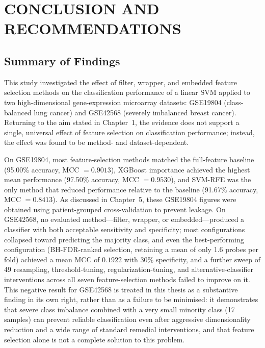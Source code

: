 \chapter{CONCLUSION AND RECOMMENDATIONS}

\section{Summary of Findings}

This study investigated the effect of filter, wrapper, and embedded feature selection methods on the classification performance of a linear SVM applied to two high-dimensional gene-expression microarray datasets: GSE19804 (class-balanced lung cancer) and GSE42568 (severely imbalanced breast cancer). Returning to the aim stated in Chapter~1, the evidence does not support a single, universal effect of feature selection on classification performance; instead, the effect was found to be method- and dataset-dependent.

On GSE19804, most feature-selection methods matched the full-feature baseline (95.00\% accuracy, MCC $=0.9013$), XGBoost importance achieved the highest mean performance (97.50\% accuracy, MCC $=0.9530$), and SVM-RFE was the only method that reduced performance relative to the baseline (91.67\% accuracy, MCC $=0.8413$). As discussed in Chapter~5, these GSE19804 figures were obtained using patient-grouped cross-validation to prevent leakage. On GSE42568, no evaluated method---filter, wrapper, or embedded---produced a classifier with both acceptable sensitivity and specificity; most configurations collapsed toward predicting the majority class, and even the best-performing configuration (BH-FDR-ranked selection, retaining a mean of only 1.6 probes per fold) achieved a mean MCC of $0.1922$ with $30\%$ specificity, and a further sweep of 49 resampling, threshold-tuning, regularization-tuning, and alternative-classifier interventions across all seven feature-selection methods failed to improve on it. This negative result for GSE42568 is treated in this thesis as a substantive finding in its own right, rather than as a failure to be minimised: it demonstrates that severe class imbalance combined with a very small minority class (17 samples) can prevent reliable classification even after aggressive dimensionality reduction and a wide range of standard remedial interventions, and that feature selection alone is not a complete solution to this problem.

